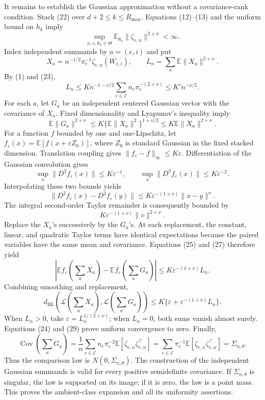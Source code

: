 It remains to establish the Gaussian approximation without a covariance-rank condition.  Stack (22) over \(d+2\leq k\leq R_{\max}\).  Equations (12)--(13) and the uniform bound on \(h_k\) imply
\[
 \sup_{n,e,\theta_n\in\Theta}
 \mathbb E_{\theta_n}\|\zeta_{e,n}\|^{2+\nu}<\infty. \tag{23}
\]
Index independent summands by \(a=(e,i)\) and put
\[
 X_a=n^{-1/2}\pi_e^{-1}\zeta_{e,n}(W_{e,i}),
 \qquad L_n=\sum_a\mathbb E\|X_a\|^{2+\nu}.
\]
By (1) and (23),
\[
 L_n\leq K n^{-1-\nu/2}\sum_{e\in\mathcal E}n_e\pi_e^{-(2+\nu)}
 \leq K'n^{-\nu/2}. \tag{24}
\]
For each \(a\), let \(G_a\) be an independent centered Gaussian vector with the covariance of \(X_a\).  Fixed dimensionality and Lyapunov's inequality imply
\[
 \mathbb E\|G_a\|^{2+\nu}
 \leq K\{\mathbb E\|X_a\|^2\}^{1+\nu/2}
 \leq K\mathbb E\|X_a\|^{2+\nu}. \tag{25}
\]
For a function \(f\) bounded by one and one-Lipschitz, let \(f_\varepsilon(x)=\mathbb E[f(x+\varepsilon Z_0)]\), where \(Z_0\) is standard Gaussian in the fixed stacked dimension.  Translation coupling gives \(\|f_\varepsilon-f\|_\infty\leq K\varepsilon\).  Differentiation of the Gaussian convolution gives
\[
 \sup_x\|D^2f_\varepsilon(x)\|\leq K\varepsilon^{-1},
 \qquad
 \sup_x\|D^3f_\varepsilon(x)\|\leq K\varepsilon^{-2}.
\]
Interpolating these two bounds yields
\[
 \|D^2f_\varepsilon(x)-D^2f_\varepsilon(y)\|
 \leq K\varepsilon^{-(1+\nu)}\|x-y\|^\nu. \tag{26}
\]
The integral second-order Taylor remainder is consequently bounded by
\[
 K\varepsilon^{-(1+\nu)}\|v\|^{2+\nu}. \tag{27}
\]
Replace the \(X_a\)'s successively by the \(G_a\)'s.  At each replacement, the constant, linear, and quadratic Taylor terms have identical expectations because the paired variables have the same mean and covariance.  Equations (25) and (27) therefore yield
\[
 \left|\mathbb Ef_\varepsilon\!\left(\sum_aX_a\right)
       -\mathbb Ef_\varepsilon\!\left(\sum_aG_a\right)\right|
 \leq K\varepsilon^{-(1+\nu)}L_n. \tag{28}
\]
Combining smoothing and replacement,
\[
 d_{\mathrm{BL}}\!\left(\mathcal L\!\left(\sum_aX_a\right),
                         \mathcal L\!\left(\sum_aG_a\right)\right)
 \leq K\{\varepsilon+\varepsilon^{-(1+\nu)}L_n\}. \tag{29}
\]
When \(L_n>0\), take \(\varepsilon=L_n^{1/(2+\nu)}\); when \(L_n=0\), both sums vanish almost surely.  Equations (24) and (29) prove uniform convergence to zero.  Finally,
\[
 \operatorname{Cov}\!\left(\sum_aG_a\right)
 =\frac1n\sum_{e\in\mathcal E}n_e\pi_e^{-2}
   \mathbb E[\zeta_{e,n}\zeta_{e,n}^\top]
 =\sum_{e\in\mathcal E}\pi_e^{-1}
   \mathbb E[\zeta_{e,n}\zeta_{e,n}^\top]
 =\Sigma_{n,\theta}. \tag{30}
\]
Thus the comparison law is \(N(0,\Sigma_{n,\theta})\).  The construction of the independent Gaussian summands is valid for every positive semidefinite covariance.  If \(\Sigma_{n,\theta}\) is singular, the law is supported on its image; if it is zero, the law is a point mass.  This proves the ambient-class expansion and all its uniformity assertions.
